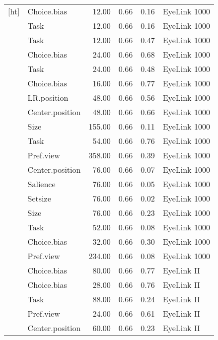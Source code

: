 \begin{longtable}{llrrrl}[ht]
  \cite{glaholt2009b} & Choice.bias & 12.00 & 0.66 & 0.16 & EyeLink 1000 \\ 
  \cite{glaholt2009b} & Task & 12.00 & 0.66 & 0.16 & EyeLink 1000 \\ 
  \cite{glaholt2009b} & Task & 12.00 & 0.66 & 0.47 & EyeLink 1000 \\ 
  \cite{glaholt2012} & Choice.bias & 24.00 & 0.66 & 0.68 & EyeLink 1000 \\ 
  \cite{glaholt2012} & Task & 24.00 & 0.66 & 0.48 & EyeLink 1000 \\ 
  \cite{glaholt2009c} & Choice.bias & 16.00 & 0.66 & 0.77 & EyeLink 1000 \\ 
  \cite{glaholt2010} & LR.position & 48.00 & 0.66 & 0.56 & EyeLink 1000 \\ 
  \cite{glaholt2010} & Center.position & 48.00 & 0.66 & 0.66 & EyeLink 1000 \\ 
  \cite{graham2016} & Size & 155.00 & 0.66 & 0.11 & EyeLink 1000 \\ 
  \cite{leboeuf2016} & Task & 54.00 & 0.66 & 0.76 & EyeLink 1000 \\ 
  \cite{miller2015} & Pref.view & 358.00 & 0.66 & 0.39 & EyeLink 1000 \\ 
  \cite{orquin2019a} & Center.position & 76.00 & 0.66 & 0.07 & EyeLink 1000 \\ 
  \cite{orquin2019a} & Salience & 76.00 & 0.66 & 0.05 & EyeLink 1000 \\ 
  \cite{orquin2019a} & Setsize & 76.00 & 0.66 & 0.02 & EyeLink 1000 \\ 
  \cite{orquin2019a} & Size & 76.00 & 0.66 & 0.23 & EyeLink 1000 \\ 
  \cite{orquin2019a} & Task & 52.00 & 0.66 & 0.08 & EyeLink 1000 \\ 
  \cite{schotter2012a} & Choice.bias & 32.00 & 0.66 & 0.30 & EyeLink 1000 \\ 
  \cite{wolfson2017} & Pref.view & 234.00 & 0.66 & 0.08 & EyeLink 1000 \\ 
  \cite{brandstatter2014} & Choice.bias & 80.00 & 0.66 & 0.77 & EyeLink II \\ 
  \cite{folke2016} & Choice.bias & 28.00 & 0.66 & 0.76 & EyeLink II \\ 
  \cite{huang2011} & Task & 88.00 & 0.66 & 0.24 & EyeLink II \\ 
  \cite{kim2012a} & Pref.view & 24.00 & 0.66 & 0.61 & EyeLink II \\ 
  \cite{meissner2016a} & Center.position & 60.00 & 0.66 & 0.23 & EyeLink II \\ 

\end{longtable}
